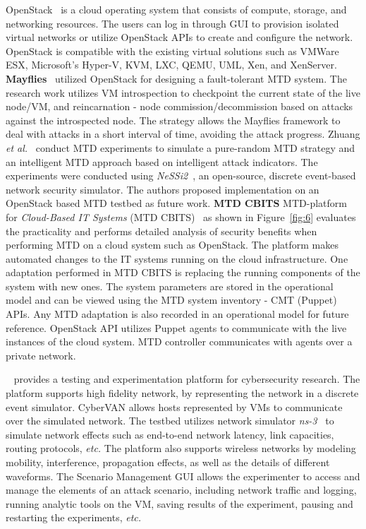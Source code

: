 {OpenStack}~ is a cloud operating system that consists of compute, storage, and networking resources. The users can log in through GUI to provision isolated virtual networks or utilize OpenStack APIs to create and configure the network. OpenStack is compatible with the existing virtual solutions such as {VMWare ESX},   {Microsoft's Hyper-V}, {KVM}, {LXC}, {QEMU}, {UML}, {Xen}, and {XenServer}. 
\textbf{Mayflies}~ utilized OpenStack for designing a {fault-tolerant} MTD system. The research work utilizes VM {introspection} to checkpoint the current state of the live node/VM, and {reincarnation} - node {commission/decommission} based on attacks against the introspected node. The strategy allows the Mayflies framework to deal with attacks in a short interval of time, avoiding the attack progress. Zhuang \textit{et al.}~ conduct MTD experiments to simulate a {pure-random MTD} strategy and an intelligent MTD approach based on intelligent attack indicators. The experiments were conducted using \emph{NeSSi2}~, an {open-source}, discrete event-based network security {simulator}. The authors proposed implementation on an OpenStack based MTD testbed as future work. 
\textbf{MTD CBITS} MTD-platform for \textit{Cloud-Based IT Systems} (MTD CBITS)~ as shown in  Figure~\ref{fig:6} evaluates the practicality and performs detailed analysis of security benefits when performing MTD on a cloud system such as OpenStack.
 The platform makes {automated changes} to the IT systems running on the cloud infrastructure. One adaptation performed in MTD CBITS is {replacing} the {running components} of the system with new ones. The system parameters are stored in the operational model and can be viewed using the MTD system inventory - {CMT (Puppet) APIs}. Any MTD adaptation is also recorded in an operational model for future reference. {OpenStack API} utilizes Puppet agents to communicate with the live instances of the cloud system. MTD controller communicates with agents over a private network.

~ provides a testing and experimentation platform for cybersecurity research. The platform supports high fidelity network, by representing the network in a discrete event simulator. CyberVAN allows hosts represented by VMs to communicate over the simulated network. The testbed utilizes network simulator \emph{ns-3}~ to simulate network effects such as end-to-end network latency, link capacities, routing protocols, {\em etc.} The platform also supports {wireless networks} by modeling {mobility}, {interference}, {propagation effects}, as well as the details of different {waveforms}. The {Scenario Management GUI} allows the experimenter to access and manage the elements of an attack scenario, including network traffic and logging, running analytic tools on the VM, saving results of the experiment, pausing and restarting the experiments, {\em etc.}

